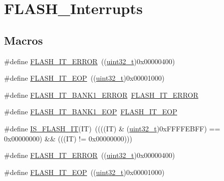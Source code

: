 \hypertarget{group___f_l_a_s_h___interrupts}{}\section{F\+L\+A\+S\+H\+\_\+\+Interrupts}
\label{group___f_l_a_s_h___interrupts}
\subsection*{Macros}
\begin{DoxyCompactItemize}
\item 
\#define \hyperlink{group___f_l_a_s_h___interrupts_ga61c74493d4c1f36ddaf563719d446a7d}{F\+L\+A\+S\+H\+\_\+\+I\+T\+\_\+\+E\+R\+R\+OR}~((\hyperlink{_p_e___types_8h_a33594304e786b158f3fb30289278f5af}{uint32\+\_\+t})0x00000400)
\item 
\#define \hyperlink{group___f_l_a_s_h___interrupts_gaea20e80e1806d58a7544cfe8659e7f11}{F\+L\+A\+S\+H\+\_\+\+I\+T\+\_\+\+E\+OP}~((\hyperlink{_p_e___types_8h_a33594304e786b158f3fb30289278f5af}{uint32\+\_\+t})0x00001000)
\item 
\#define \hyperlink{group___f_l_a_s_h___interrupts_ga808627239be1bf9c2d8bfed36ec4db19}{F\+L\+A\+S\+H\+\_\+\+I\+T\+\_\+\+B\+A\+N\+K1\+\_\+\+E\+R\+R\+OR}~\hyperlink{group___f_l_a_s_h___interrupts_ga61c74493d4c1f36ddaf563719d446a7d}{F\+L\+A\+S\+H\+\_\+\+I\+T\+\_\+\+E\+R\+R\+OR}
\item 
\#define \hyperlink{group___f_l_a_s_h___interrupts_gac8825e2ce2c0e6ca63a40a347bd351a9}{F\+L\+A\+S\+H\+\_\+\+I\+T\+\_\+\+B\+A\+N\+K1\+\_\+\+E\+OP}~\hyperlink{group___f_l_a_s_h___interrupts_gaea20e80e1806d58a7544cfe8659e7f11}{F\+L\+A\+S\+H\+\_\+\+I\+T\+\_\+\+E\+OP}
\item 
\#define \hyperlink{group___f_l_a_s_h___interrupts_ga46ee77d0be1f3e0a14ded0651163ae11}{I\+S\+\_\+\+F\+L\+A\+S\+H\+\_\+\+IT}(IT)~((((IT) \& (\hyperlink{_p_e___types_8h_a33594304e786b158f3fb30289278f5af}{uint32\+\_\+t})0x\+F\+F\+F\+F\+E\+B\+F\+F) == 0x00000000) \&\& (((\+I\+T) != 0x00000000)))
\item 
\#define \hyperlink{group___f_l_a_s_h___interrupts_ga61c74493d4c1f36ddaf563719d446a7d}{F\+L\+A\+S\+H\+\_\+\+I\+T\+\_\+\+E\+R\+R\+OR}~((\hyperlink{_p_e___types_8h_a33594304e786b158f3fb30289278f5af}{uint32\+\_\+t})0x00000400)
\item 
\#define \hyperlink{group___f_l_a_s_h___interrupts_gaea20e80e1806d58a7544cfe8659e7f11}{F\+L\+A\+S\+H\+\_\+\+I\+T\+\_\+\+E\+OP}~((\hyperlink{_p_e___types_8h_a33594304e786b158f3fb30289278f5af}{uint32\+\_\+t})0x00001000)

\end{DoxyCompactItemize}
